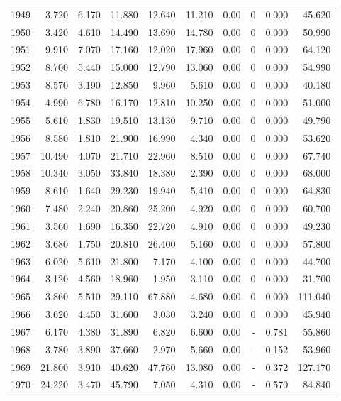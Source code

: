 \documentclass[
]{scrartcl}
\begin{document}
\begin{landscape}
\begin{longtable}{rrrrrrrrrr}
1949 & 3.720 & 6.170 & 11.880 & 12.640 & 11.210 & 0.00 & 0 & 0.000 & 45.620 \\ 
1950 & 3.420 & 4.610 & 14.490 & 13.690 & 14.780 & 0.00 & 0 & 0.000 & 50.990 \\ 
1951 & 9.910 & 7.070 & 17.160 & 12.020 & 17.960 & 0.00 & 0 & 0.000 & 64.120 \\ 
1952 & 8.700 & 5.440 & 15.000 & 12.790 & 13.060 & 0.00 & 0 & 0.000 & 54.990 \\ 
1953 & 8.570 & 3.190 & 12.850 & 9.960 & 5.610 & 0.00 & 0 & 0.000 & 40.180 \\ 
1954 & 4.990 & 6.780 & 16.170 & 12.810 & 10.250 & 0.00 & 0 & 0.000 & 51.000 \\ 
1955 & 5.610 & 1.830 & 19.510 & 13.130 & 9.710 & 0.00 & 0 & 0.000 & 49.790 \\ 
1956 & 8.580 & 1.810 & 21.900 & 16.990 & 4.340 & 0.00 & 0 & 0.000 & 53.620 \\ 
1957 & 10.490 & 4.070 & 21.710 & 22.960 & 8.510 & 0.00 & 0 & 0.000 & 67.740 \\ 
1958 & 10.340 & 3.050 & 33.840 & 18.380 & 2.390 & 0.00 & 0 & 0.000 & 68.000 \\ 
1959 & 8.610 & 1.640 & 29.230 & 19.940 & 5.410 & 0.00 & 0 & 0.000 & 64.830 \\ 
1960 & 7.480 & 2.240 & 20.860 & 25.200 & 4.920 & 0.00 & 0 & 0.000 & 60.700 \\ 
1961 & 3.560 & 1.690 & 16.350 & 22.720 & 4.910 & 0.00 & 0 & 0.000 & 49.230 \\ 
1962 & 3.680 & 1.750 & 20.810 & 26.400 & 5.160 & 0.00 & 0 & 0.000 & 57.800 \\ 
1963 & 6.020 & 5.610 & 21.800 & 7.170 & 4.100 & 0.00 & 0 & 0.000 & 44.700 \\ 
1964 & 3.120 & 4.560 & 18.960 & 1.950 & 3.110 & 0.00 & 0 & 0.000 & 31.700 \\ 
1965 & 3.860 & 5.510 & 29.110 & 67.880 & 4.680 & 0.00 & 0 & 0.000 & 111.040 \\ 
1966 & 3.620 & 4.450 & 31.600 & 3.030 & 3.240 & 0.00 & 0 & 0.000 & 45.940 \\ 
1967 & 6.170 & 4.380 & 31.890 & 6.820 & 6.600 & 0.00 &  -  & 0.781 & 55.860 \\ 
1968 & 3.780 & 3.890 & 37.660 & 2.970 & 5.660 & 0.00 &  -  & 0.152 & 53.960 \\ 
1969 & 21.800 & 3.910 & 40.620 & 47.760 & 13.080 & 0.00 &  -  & 0.372 & 127.170 \\ 
1970 & 24.220 & 3.470 & 45.790 & 7.050 & 4.310 & 0.00 &  -  & 0.570 & 84.840 \\ 

\end{longtable}
\end{landscape}
\end{document}
